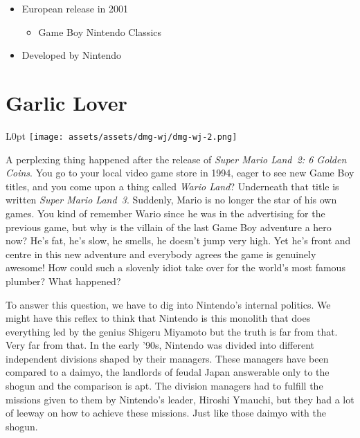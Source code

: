\documentclass{book}
\begin{document}
\begin{itemize} [nosep]
\item European release in 2001
\begin{itemize} [nosep]\item Game Boy Nintendo Classics\end{itemize}\noindent




































\item Developed by Nintendo

\end{itemize}\noindent

\newpage\FloatBarrier\needspace{10mm}\section*{Garlic Lover}\nopagebreak[4]
\begin{wrapfigure}{L}{0pt} \texttt{[image: assets/assets/dmg-wj/dmg-wj-2.png]}\end{wrapfigure}
A perplexing thing happened after the release of \emph{Super Mario Land~2: 6 Golden Coins}. You go to your local video game store in 1994, eager to see new Game Boy titles, and you come upon a thing called \emph{Wario Land}? Underneath that title is written \emph{Super Mario Land~3}. Suddenly, Mario is no longer the star of his own games. You kind of remember Wario since he was in the advertising for the previous game, but why is the villain of the last Game Boy adventure a hero now? He’s fat, he’s slow, he smells, he doesn’t jump very high. Yet he’s front and centre in this new adventure and everybody agrees the game is genuinely awesome! How could such a slovenly idiot take over for the world’s most famous plumber? What happened?

To answer this question, we have to dig into Nintendo’s internal politics. We might have this reflex to think that Nintendo is this monolith that does everything led by the genius Shigeru Miyamoto but the truth is far from that. Very far from that. In the early ’90s, Nintendo was divided into different independent divisions shaped by their managers. These managers have been compared to a daimyo, the landlords of feudal Japan answerable only to the shogun and the comparison is apt. The division managers had to fulfill the missions given to them by Nintendo’s leader, Hiroshi Ymauchi, but they had a lot of leeway on how to achieve these missions. Just like those daimyo with the shogun.
\end{document}
